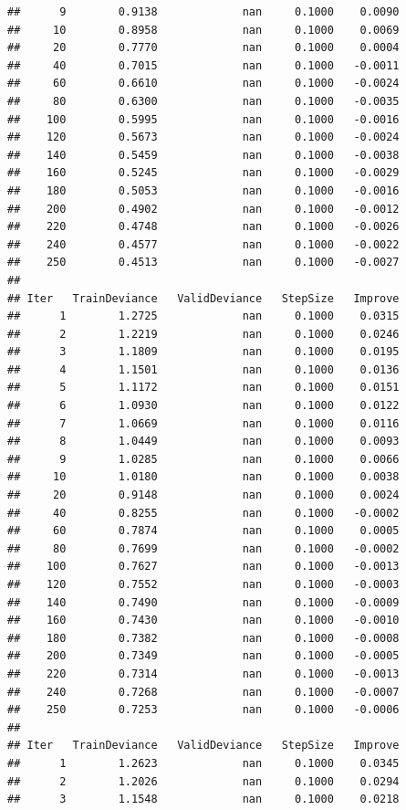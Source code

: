 \documentclass[]{book}
\begin{document}
\begin{verbatim}
##      9        0.9138             nan     0.1000    0.0090
##     10        0.8958             nan     0.1000    0.0069
##     20        0.7770             nan     0.1000    0.0004
##     40        0.7015             nan     0.1000   -0.0011
##     60        0.6610             nan     0.1000   -0.0024
##     80        0.6300             nan     0.1000   -0.0035
##    100        0.5995             nan     0.1000   -0.0016
##    120        0.5673             nan     0.1000   -0.0024
##    140        0.5459             nan     0.1000   -0.0038
##    160        0.5245             nan     0.1000   -0.0029
##    180        0.5053             nan     0.1000   -0.0016
##    200        0.4902             nan     0.1000   -0.0012
##    220        0.4748             nan     0.1000   -0.0026
##    240        0.4577             nan     0.1000   -0.0022
##    250        0.4513             nan     0.1000   -0.0027
## 
## Iter   TrainDeviance   ValidDeviance   StepSize   Improve
##      1        1.2725             nan     0.1000    0.0315
##      2        1.2219             nan     0.1000    0.0246
##      3        1.1809             nan     0.1000    0.0195
##      4        1.1501             nan     0.1000    0.0136
##      5        1.1172             nan     0.1000    0.0151
##      6        1.0930             nan     0.1000    0.0122
##      7        1.0669             nan     0.1000    0.0116
##      8        1.0449             nan     0.1000    0.0093
##      9        1.0285             nan     0.1000    0.0066
##     10        1.0180             nan     0.1000    0.0038
##     20        0.9148             nan     0.1000    0.0024
##     40        0.8255             nan     0.1000   -0.0002
##     60        0.7874             nan     0.1000    0.0005
##     80        0.7699             nan     0.1000   -0.0002
##    100        0.7627             nan     0.1000   -0.0013
##    120        0.7552             nan     0.1000   -0.0003
##    140        0.7490             nan     0.1000   -0.0009
##    160        0.7430             nan     0.1000   -0.0010
##    180        0.7382             nan     0.1000   -0.0008
##    200        0.7349             nan     0.1000   -0.0005
##    220        0.7314             nan     0.1000   -0.0013
##    240        0.7268             nan     0.1000   -0.0007
##    250        0.7253             nan     0.1000   -0.0006
## 
## Iter   TrainDeviance   ValidDeviance   StepSize   Improve
##      1        1.2623             nan     0.1000    0.0345
##      2        1.2026             nan     0.1000    0.0294
##      3        1.1548             nan     0.1000    0.0218

\end{verbatim}
\end{document}
